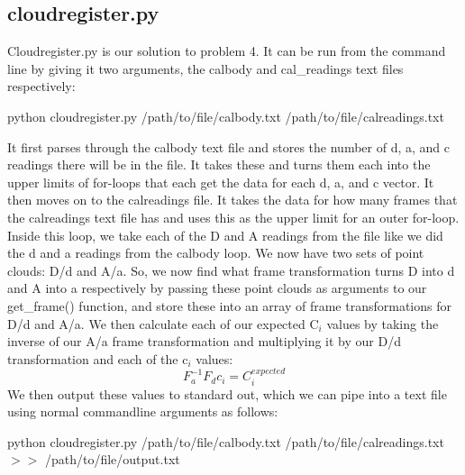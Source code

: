 \documentclass[a4paper]{article}
\begin{document}
\subsection{cloudregister.py}
Cloudregister.py is our solution to problem 4. It can be run from the command line by giving it two arguments, the calbody and cal\_readings text files respectively: \break
\begin{center}
python cloudregister.py /path/to/file/calbody.txt /path/to/file/calreadings.txt \break
\end{center}
It first parses through the calbody text file and stores the number of d, a, and c readings there will be in the file. It takes these and turns them each into the upper limits of for-loops that each get the data for each d, a, and c vector.
It then moves on to the calreadings file. It takes the data for how many frames that the calreadings text file has and uses this as the upper limit for an outer for-loop. Inside this loop, we take each of the D and A readings from the file like we did the d and a readings from the calbody loop. We now have two sets of point clouds: D/d and A/a. So, we now find what frame transformation turns D into d and A into a respectively by passing these point clouds as arguments to our get\_frame() function, and store these into an array of frame transformations for D/d and A/a.
We then calculate each of our expected C$_i$ values by taking the inverse of our A/a frame transformation and multiplying it by our D/d transformation and each of the c$_i$ values:
\[F_a^{-1}F_dc_i = C_i^{expected}\]
We then output these values to standard out, which we can pipe into a text file using normal commandline arguments as follows:
\begin{center}
python cloudregister.py /path/to/file/calbody.txt /path/to/file/calreadings.txt $>>$ /path/to/file/output.txt
\end{center}
\end{document}
